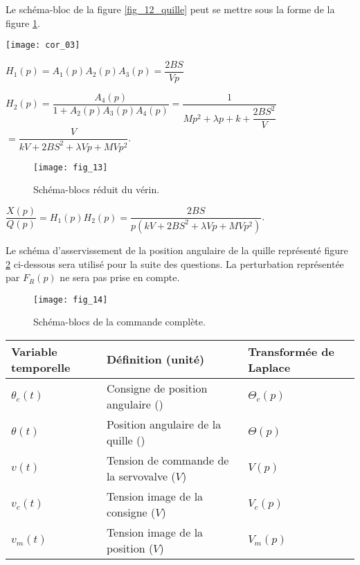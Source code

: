 Le schéma-bloc de la figure \ref{fig_12_quille} peut se mettre sous la forme de la figure \ref{fig_13_quille}.

\ifprof
\begin{corrige}
\begin{center}
\texttt{[image: cor\_03]}
\end{center}
$H_1(p)= A_1(p)A_2(p)A_3(p) =\dfrac{2BS}{Vp}$

$H_2(p) = \dfrac{A_4(p)}{1+A_2(p)A_3(p)A_4(p)} = \dfrac{1}{Mp^2 + \lambda p + k + \dfrac{2BS^2}{V}}$ $=\dfrac{V}{kV + 2BS^2 + \lambda V p + MVp^2}$.
 
\end{corrige}
\else
\fi


\ifprof
\else

\begin{figure}[!h]
\centering
\texttt{[image: fig\_13]}
\caption{Schéma-blocs réduit du vérin. \label{fig_13_quille}}
\end{figure}
\fi


\ifprof
\begin{corrige}
$\dfrac{X(p)}{Q(p)} = H_1(p)H_2(p) = \dfrac{2BS}{p\left(kV + 2BS^2 + \lambda V p + MVp^2\right)}$.
\end{corrige}
\else
\fi


\ifprof
\else
Le schéma d’asservissement de la position angulaire de la quille représenté figure \ref{fig_14_quille} ci-dessous sera utilisé pour la suite des questions. La perturbation représentée par $F_R(p)$ ne sera pas prise en compte.

\begin{figure}[!h]
\centering
\texttt{[image: fig\_14]}
\caption{Schéma-blocs de la commande complète. \label{fig_14_quille}}
\end{figure}


\begin{center}
\begin{tabular}{lll}
\hline
Variable temporelle	& Définition (unité)				& Transformée de Laplace \\
\hline
$\theta_c(t)$		& Consigne de position angulaire (\degres)	& $\Theta_c(p)$ \\
$\theta(t)$		& Position angulaire de la quille (\degres)	& $\Theta(p)$ \\
$v(t)$			& Tension de commande de la servovalve ($V$)	& $V(p)$ 	\\
$v_c(t)$		& Tension image de la consigne ($V$)		& $V_c(p)$ 	\\
$v_m(t)$ 	 	& Tension image de la position ($V$)		& $V_m(p)$ 	\\
\hline
\end{tabular}
\end{center}



